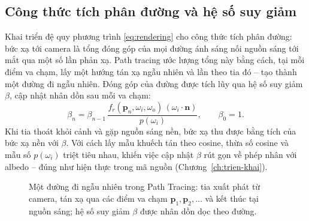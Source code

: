 \subsection{Công thức tích phân đường và hệ số suy giảm}
Khai triển đệ quy phương trình \eqref{eq:rendering} cho công thức tích phân
đường: bức xạ tới camera là tổng đóng góp của mọi đường ánh sáng
nối nguồn sáng tới mắt qua một số lần phản xạ. Path tracing ước lượng tổng này
bằng cách, tại mỗi điểm va chạm, lấy một hướng tán xạ ngẫu nhiên và lần
theo tia đó -- tạo thành một đường đi ngẫu nhiên. Đóng góp của đường được tích
lũy qua hệ số suy giảm $\beta$, cập nhật nhân dồn sau mỗi va
chạm:
\begin{equation}
\label{eq:throughput}
\beta_n = \beta_{n-1}\,
          \frac{f_r(\mathbf{p}_n,\omega_i,\omega_o)\,(\omega_i\cdot\mathbf{n})}
               {p(\omega_i)},
\qquad \beta_0 = 1 .
\end{equation}
Khi tia thoát khỏi cảnh và gặp nguồn sáng nền, bức xạ thu được bằng tích của bức
xạ nền với $\beta$. Với cách lấy mẫu khuếch tán theo cosine, thừa số cosine và
mẫu số $p(\omega_i)$ triệt tiêu nhau, khiến việc cập nhật $\beta$ rút gọn về phép
nhân với albedo -- đúng như hiện thực trong mã nguồn (Chương~\ref{ch:trien-khai}).

\begin{figure}[H]
\centering
{}
\caption{Một đường đi ngẫu nhiên trong Path Tracing: tia xuất phát từ camera, tán
xạ qua các điểm va chạm $\mathbf{p}_1,\mathbf{p}_2,\dots$ và kết thúc tại nguồn
sáng; hệ số suy giảm $\beta$ được nhân dồn dọc theo đường.}
\label{fig:pathtrace}
\end{figure}


